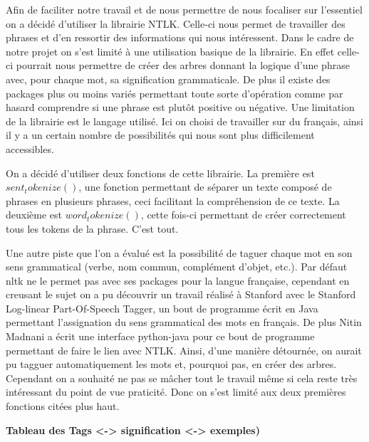 \documentclass[french,12pt]{article}
\begin{document}
\begin{enumerate}
\bigbreak
\raggedright
\setlength{\parindent}{0,5cm}


Afin de faciliter notre travail et de nous permettre de nous focaliser sur l’essentiel on a décidé d’utiliser la librairie NTLK. Celle-ci nous permet de travailler des phrases et d’en ressortir des informations qui nous intéressent.
\bigbreak
Dans le cadre de notre projet on s’est limité à une utilisation basique de la librairie. En effet celle-ci pourrait nous permettre de créer des arbres donnant la logique d’une phrase avec, pour chaque mot, sa signification grammaticale. De plus il existe des packages plus ou moins variés permettant toute sorte d’opération comme par hasard comprendre si une phrase est plutôt positive ou négative. Une limitation de la librairie est le langage utilisé. Ici on choisi de travailler sur du français, ainsi il y a un certain nombre de possibilités qui nous sont plus difficilement accessibles.
\bigbreak
\begin{sloppypar}
On a décidé d’utiliser deux fonctions de cette librairie. La première est $sent_tokenize()$, une fonction permettant de séparer un texte composé de phrases en plusieurs phrases, ceci facilitant la compréhension de ce texte. La deuxième est $word_tokenize()$, cette fois-ci permettant de créer correctement tous les tokens de la phrase. C’est tout.
\end{sloppypar}
\bigbreak
\begin{sloppypar}
Une autre piste que l’on a évalué est la possibilité de taguer chaque mot en son sens grammatical (verbe, nom commun, complément d’objet, etc.). Par défaut nltk ne le permet pas avec ses packages pour la langue française, cependant en creusant le sujet on a pu découvrir un travail réalisé à Stanford avec le Stanford Log-linear Part-Of-Speech Tagger, un bout de programme écrit en Java permettant l’assignation du sens grammatical des mots en français. De plus Nitin Madnani a écrit une interface python-java pour ce bout de programme permettant de faire le lien avec NTLK. Ainsi, d’une manière détournée, on aurait pu tagguer automatiquement les mots et, pourquoi pas, en créer des arbres. Cependant on a souhaité ne pas se mâcher tout le travail même si cela reste très intéressant du point de vue praticité. Donc on s’est limité aux deux premières fonctions citées plus haut.

\end{sloppypar}
\end{enumerate}
\bigbreak
\textbf{Tableau des Tags <-> signification <-> exemples)} \\
\end{document}
